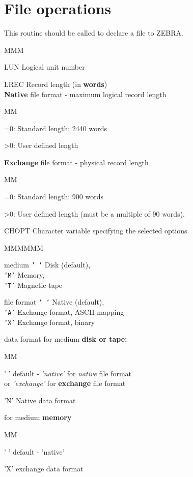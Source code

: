 \section{File operations}
This routine should be called to declare a file to ZEBRA.
\Idesc
\begin{DL}{MMM}
\item[LUN]Logical unit number
\item[LREC]Record length (in {\bf words})\\
{\bf Native} file format - maximum logical record length
\begin{DL}{MM}
\item[=0:] Standard length: 2440 words
\item[>0:] User defined length
\end{DL}
{\bf Exchange} file format - physical record length
\begin{DL}{MM}
\item[=0:] Standard length: 900 words
\item[>0:] User defined length (must be a multiple of 90 words).
\end{DL}
\item[CHOPT]Character variable specifying the selected options.
\begin{DL}{MMMMMM}
\item[medium]{\tt' '} Disk (default),\\
{\tt'M'} Memory,                    \\
{\tt'T'} Magnetic tape
\item[file format]{\tt' '} Native (default),\\
{\tt'A'} Exchange format, ASCII mapping    \\
{\tt'X'} Exchange format, binary
\item[data format]for medium {\bf disk or tape:}
\begin{DL}{MM}
\item[' ']default - {\it 'native'} for {\it native} file format\\
or    {\it 'exchange'} for {\bf exchange} file format
\item['N']Native data format
\end{DL}
for medium {\bf memory}
\begin{DL}{MM}
\item[' ']default - 'native'
\item['X']exchange data format
\end{DL}

\end{DL}
\end{DL}
